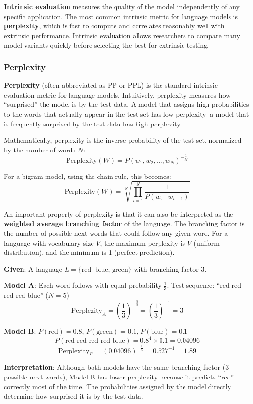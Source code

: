 \documentclass[11pt,a4paper]{article}
\begin{document}
\textbf{Intrinsic evaluation} measures the quality of the model independently of any specific application. The most common intrinsic metric for language models is \textbf{perplexity}, which is fast to compute and correlates reasonably well with extrinsic performance. Intrinsic evaluation allows researchers to compare many model variants quickly before selecting the best for extrinsic testing.

\subsubsection{Perplexity}

\textbf{Perplexity} (often abbreviated as PP or PPL) is the standard intrinsic evaluation metric for language models. Intuitively, perplexity measures how ``surprised'' the model is by the test data. A model that assigns high probabilities to the words that actually appear in the test set has low perplexity; a model that is frequently surprised by the test data has high perplexity.

Mathematically, perplexity is the inverse probability of the test set, normalized by the number of words $N$:
\[
\text{Perplexity}(W) = P(w_1, w_2, \ldots, w_N)^{-\frac{1}{N}}
\]

For a bigram model, using the chain rule, this becomes:
\[
\text{Perplexity}(W) = \sqrt[N]{\prod_{i=1}^{N} \frac{1}{P(w_i \mid w_{i-1})}}
\]

An important property of perplexity is that it can also be interpreted as the \textbf{weighted average branching factor} of the language. The branching factor is the number of possible next words that could follow any given word. For a language with vocabulary size $V$, the maximum perplexity is $V$ (uniform distribution), and the minimum is 1 (perfect prediction).

\begin{tcolorbox}[colback=green!5!white,colframe=green!75!black,title=\textbf{Numerical: Perplexity as Weighted Average Branching Factor}]
\textbf{Given}: A language $L = \{\text{red, blue, green}\}$ with branching factor 3.

\textbf{Model A}: Each word follows with equal probability $\frac{1}{3}$.
Test sequence: ``red red red red blue'' ($N=5$)
\[
\text{Perplexity}_A = \left(\frac{1}{3}\right)^{-\frac{5}{5}} = \left(\frac{1}{3}\right)^{-1} = 3
\]

\textbf{Model B}: $P(\text{red}) = 0.8$, $P(\text{green}) = 0.1$, $P(\text{blue}) = 0.1$
\[
P(\text{red red red red blue}) = 0.8^4 \times 0.1 = 0.04096
\]
\[
\text{Perplexity}_B = (0.04096)^{-\frac{1}{5}} = 0.527^{-1} = 1.89
\]

\textbf{Interpretation}: Although both models have the same branching factor (3 possible next words), Model B has lower perplexity because it predicts ``red'' correctly most of the time. The probabilities assigned by the model directly determine how surprised it is by the test data.
\end{tcolorbox}
\end{document}
